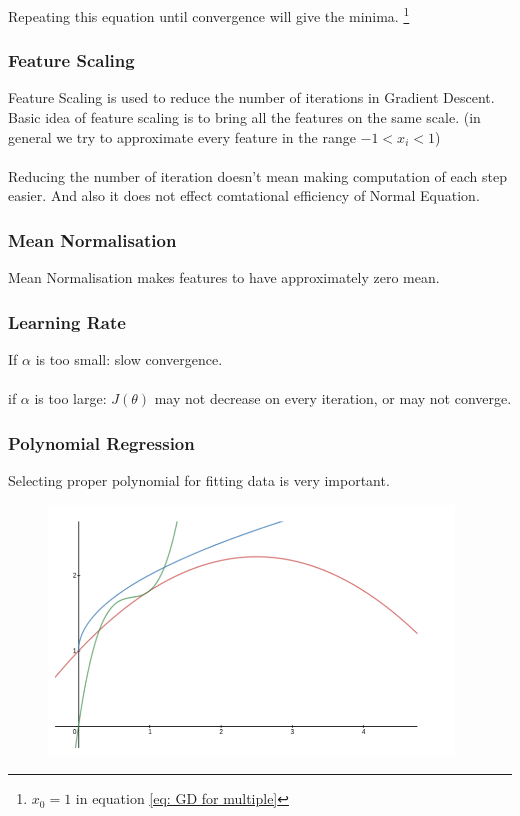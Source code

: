 \documentclass[12pt, A4]{report}
\begin{document}
    Repeating this equation until convergence will give the minima. \footnote[1]{$x_0 = 1$ in equation \ref{eq: GD for multiple}}

  \subsubsection*{Feature Scaling}
    Feature Scaling is used to reduce the number of iterations in Gradient Descent. Basic idea of feature scaling is to bring all the features on the same scale. (in general we try to approximate every feature in the range $ -1 < x_i < 1 $)
    \\ \\ Reducing the number of iteration doesn't mean making computation of each step easier. And also it does not effect comtational efficiency of Normal Equation.

  \subsubsection*{Mean Normalisation}
    Mean Normalisation makes features to have approximately zero mean.

  \subsubsection*{Learning Rate}
    If $\alpha$ is too small: slow convergence.\\ \\
    if $\alpha$ is too large: $J(\theta)$ may not decrease on every iteration, or may not converge.

  \subsubsection*{Polynomial Regression}
    Selecting proper polynomial for fitting data is very important.

    \begin{figure}[h]
        \includegraphics[scale = 0.6]{polyreg.png}
    \end{figure}
\end{document}
